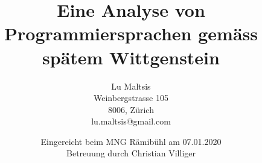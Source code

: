 \documentclass[10pt,a4paper]{article}
\begin{document}
\setcounter{page}{0}


\title{\Large{\textbf{Eine Analyse von Programmiersprachen gemäss spätem Wittgenstein}}}
\author{Lu Maltsis \\
Weinbergstrasse 105 \\
8006, Zürich \\
lu.maltsis@gmail.com \\
}
\date{Eingereicht beim MNG Rämibühl am 07.01.2020 \\
\vspace{10mm}
Betreuung durch Christian Villiger}
\maketitle
\newpage


\setcounter{section}{-1}
\enlargethispage{\baselineskip}
\tableofcontents{}
\end{document}
